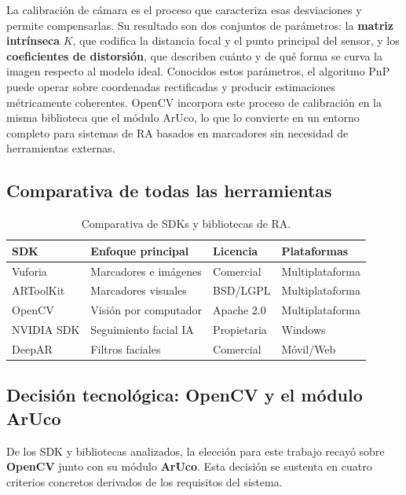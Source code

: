 La calibración de cámara es el proceso que caracteriza esas desviaciones y permite compensarlas. 
Su resultado son dos conjuntos de parámetros: la \textbf{matriz intrínseca} $K$, que codifica 
la distancia focal y el punto principal del sensor, y los \textbf{coeficientes de distorsión}, 
que describen cuánto y de qué forma se curva la imagen respecto al modelo ideal. Conocidos 
estos parámetros, el algoritmo PnP puede operar sobre coordenadas rectificadas y producir 
estimaciones métricamente coherentes. OpenCV incorpora este proceso de calibración en la misma 
biblioteca que el módulo ArUco, lo que lo convierte en un entorno completo para sistemas de 
RA basados en marcadores sin necesidad de herramientas externas.

\subsection{Comparativa de todas las herramientas}
\label{subsec:comparativa-sdks}
\begin{table}[H]
\centering
\small
\begin{tabular}{l l l l}
\toprule
\textbf{SDK} & \textbf{Enfoque principal} & \textbf{Licencia} & \textbf{Plataformas} \\
\midrule
Vuforia    & Marcadores e imágenes  & Comercial   & Multiplataforma \\
ARToolKit  & Marcadores visuales    & BSD/LGPL    & Multiplataforma \\
OpenCV     & Visión por computador  & Apache 2.0  & Multiplataforma \\
NVIDIA SDK & Seguimiento facial IA  & Propietaria & Windows         \\
DeepAR     & Filtros faciales       & Comercial   & Móvil/Web       \\
\bottomrule
\end{tabular}
\caption{Comparativa de SDKs y bibliotecas de RA.}
\label{tab:comparativa-sdks}
\end{table}
\subsection{Decisión tecnológica: OpenCV y el módulo ArUco}
\label{subsec:decision_tecnologica}

De los SDK y bibliotecas analizados, la elección para este trabajo recayó sobre \textbf{OpenCV} junto con su módulo \textbf{ArUco}. Esta decisión se sustenta en cuatro criterios concretos derivados de los requisitos del sistema.

